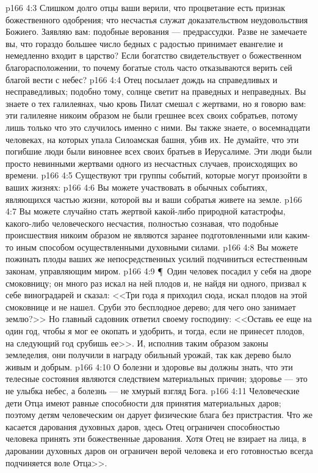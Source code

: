 \vs p166 4:3 Слишком долго отцы ваши верили, что процветание есть признак божественного одобрения; что несчастья служат доказательством неудовольствия Божиего. Заявляю вам: подобные верования --- предрассудки. Разве не замечаете вы, что гораздо большее число бедных с радостью принимает евангелие и немедленно входит в царство? Если богатство свидетельствует о божественном благорасположении, то почему богатые столь часто отказываются верить сей благой вести с небес?
\vs p166 4:4 Отец посылает дождь на справедливых и несправедливых; подобно тому, солнце светит на праведных и неправедных. Вы знаете о тех галилеянах, чью кровь Пилат смешал с жертвами, но я говорю вам: эти галилеяне никоим образом не были грешнее всех своих собратьев, потому лишь только что это случилось именно с ними. Вы также знаете, о восемнадцати человеках, на которых упала Силоамская башня, убив их. Не думайте, что эти погибшие люди были виновнее всех своих братьев в Иерусалиме. Эти люди были просто невинными жертвами одного из несчастных случаев, происходящих во времени.
\vs p166 4:5 Существуют три группы событий, которые могут произойти в ваших жизнях:
\vs p166 4:6 \bibnobreakspace Вы можете участвовать в обычных событиях, являющихся частью жизни, которой вы и ваши собратья живете на земле.
\vs p166 4:7 \bibnobreakspace Вы можете случайно стать жертвой какой\hyp{}либо природной катастрофы, какого\hyp{}либо человеческого несчастия, полностью сознавая, что подобные происшествия никоим образом не являются заранее подготовленными или каким\hyp{}то иным способом осуществленными духовными силами.
\vs p166 4:8 \bibnobreakspace Вы можете пожинать плоды ваших же непосредственных усилий подчиниться естественным законам, управляющим миром.
\vs p166 4:9 \P\ Один человек посадил у себя на дворе смоковницу; он много раз искал на ней плодов и, не найдя ни одного, призвал к себе виноградарей и сказал: <<Три года я приходил сюда, искал плодов на этой смоковнице и не нашел. Сруби это бесплодное дерево; для чего оно занимает землю?>> Но главный садовник ответил своему господину: <<Оставь ее еще на один год, чтобы я мог ее окопать и удобрить, и тогда, если не принесет плодов, на следующий год срубишь ее>>. И, исполнив таким образом законы земледелия, они получили в награду обильный урожай, так как дерево было живым и добрым.
\vs p166 4:10 О болезни и здоровье вы должны знать, что эти телесные состояния являются следствием материальных причин; здоровье --- это не улыбка небес, а болезнь --- не хмурый взгляд Бога.
\vs p166 4:11 Человеческие дети Отца имеют равные способности для принятия материальных даров; поэтому детям человеческим он дарует физические блага без пристрастия. Что же касается дарования духовных даров, здесь Отец ограничен способностью человека принять эти божественные дарования. Хотя Отец не взирает на лица, в даровании духовных даров он ограничен верой человека и его готовностью всегда подчиняется воле Отца>>.
